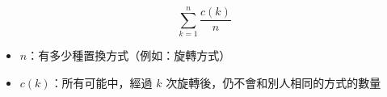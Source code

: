 $$
\sum\limits_{k=1}^{n} \frac{c(k)}{n}
$$

\begin{itemize}
    \item $n$：有多少種置換方式（例如：旋轉方式）
    \item $c(k)$：所有可能中，經過 $k$ 次旋轉後，仍不會和別人相同的方式的數量
\end{itemize}